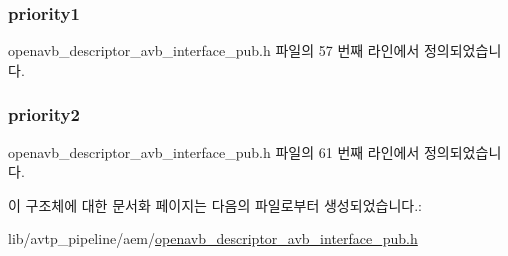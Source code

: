 \subsubsection[{\texorpdfstring{priority1}{priority1}}]{ priority1}\hypertarget{structopenavb__aem__descriptor__avb__interface__t_a414abecc05c181f8d85ea0b3dd63d135}{}\label{structopenavb__aem__descriptor__avb__interface__t_a414abecc05c181f8d85ea0b3dd63d135}


openavb\+\_\+descriptor\+\_\+avb\+\_\+interface\+\_\+pub.\+h 파일의 57 번째 라인에서 정의되었습니다.

\subsubsection[{\texorpdfstring{priority2}{priority2}}]{ priority2}\hypertarget{structopenavb__aem__descriptor__avb__interface__t_ac15d4b669bc19e29abefa46b54d36656}{}\label{structopenavb__aem__descriptor__avb__interface__t_ac15d4b669bc19e29abefa46b54d36656}


openavb\+\_\+descriptor\+\_\+avb\+\_\+interface\+\_\+pub.\+h 파일의 61 번째 라인에서 정의되었습니다.



이 구조체에 대한 문서화 페이지는 다음의 파일로부터 생성되었습니다.\+:\begin{DoxyCompactItemize}
\item 
lib/avtp\+\_\+pipeline/aem/\hyperlink{openavb__descriptor__avb__interface__pub_8h}{openavb\+\_\+descriptor\+\_\+avb\+\_\+interface\+\_\+pub.\+h}\end{DoxyCompactItemize}
